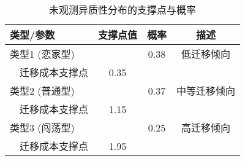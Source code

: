 \begin{table}[htbp]
\centering
\caption{未观测异质性分布的支撑点与概率}
\begin{tabular}{lccc}
\toprule
类型/参数 & 支撑点值 & 概率 & 描述 \\
\midrule
类型1 (恋家型) & & 0.38 & 低迁移倾向 \\
$\quad$迁移成本支撑点 & 0.35 & & \\
类型2 (普通型) & & 0.37 & 中等迁移倾向 \\
$\quad$迁移成本支撑点 & 1.15 & & \\
类型3 (闯荡型) & & 0.25 & 高迁移倾向 \\
$\quad$迁移成本支撑点 & 1.95 & & \\
\bottomrule
\end{tabular}
\end{table}